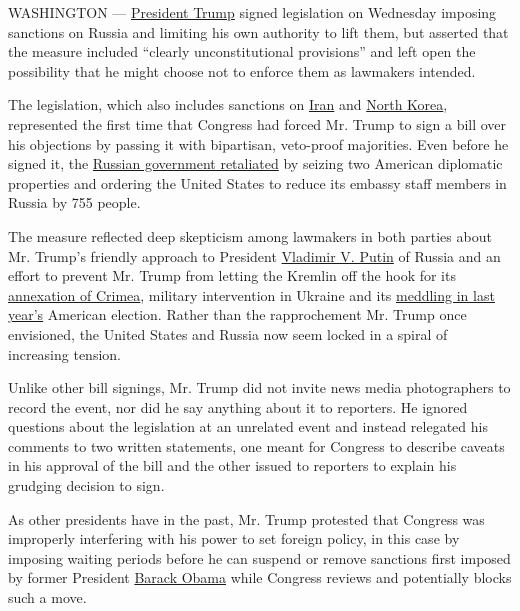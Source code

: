 WASHINGTON ---
\href{https://www.nytimes.com/topic/person/donald-trump}{President
Trump} signed legislation on Wednesday imposing sanctions on Russia and
limiting his own authority to lift them, but asserted that the measure
included ``clearly unconstitutional provisions'' and left open the
possibility that he might choose not to enforce them as lawmakers
intended.

The legislation, which also includes sanctions on
\href{https://www.nytimes.com/topic/destination/iran}{Iran} and
\href{https://www.nytimes.com/topic/destination/north-korea}{North
Korea}, represented the first time that Congress had forced Mr. Trump to
sign a bill over his objections by passing it with bipartisan,
veto-proof majorities. Even before he signed it, the
\href{https://www.nytimes.com/2017/07/30/world/europe/russia-sanctions-us-diplomats-expelled.html}{Russian
government retaliated} by seizing two American diplomatic properties and
ordering the United States to reduce its embassy staff members in Russia
by 755 people.

The measure reflected deep skepticism among lawmakers in both parties
about Mr. Trump's friendly approach to President
\href{https://www.nytimes.com/topic/person/vladimir-putin}{Vladimir V.
Putin} of Russia and an effort to prevent Mr. Trump from letting the
Kremlin off the hook for its
\href{https://www.nytimes.com/2014/03/19/world/europe/ukraine.html}{annexation
of Crimea}, military intervention in Ukraine and its
\href{https://www.nytimes.com/2016/12/09/us/obama-russia-election-hack.html}{meddling
in last year's} American election. Rather than the rapprochement Mr.
Trump once envisioned, the United States and Russia now seem locked in a
spiral of increasing tension.

Unlike other bill signings, Mr. Trump did not invite news media
photographers to record the event, nor did he say anything about it to
reporters. He ignored questions about the legislation at an unrelated
event and instead relegated his comments to two written statements, one
meant for Congress to describe caveats in his approval of the bill and
the other issued to reporters to explain his grudging decision to sign.

As other presidents have in the past, Mr. Trump protested that Congress
was improperly interfering with his power to set foreign policy, in this
case by imposing waiting periods before he can suspend or remove
sanctions first imposed by former President
\href{https://www.nytimes.com/topic/person/barack-obama}{Barack Obama}
while Congress reviews and potentially blocks such a move.

